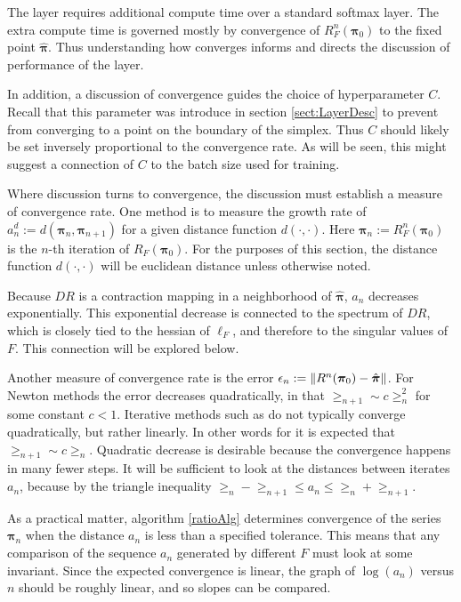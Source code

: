 \label{sect:expConvRate}
The \RS layer requires additional compute time over a standard softmax layer. The extra compute time is governed mostly by convergence of \( R_F^n(\bm\pi_0) \) to the fixed point \( \hat{\bm \pi} \). Thus understanding how \DR converges informs and directs the discussion of performance of the \RS layer.  

In addition, a discussion of convergence guides the choice of hyperparameter \( C \). Recall that this parameter was introduce in section \ref{sect:LayerDesc} to prevent \DR from converging to a point on the boundary of the simplex. Thus \( C \) should likely be set inversely proportional to the convergence rate. As will be seen, this might suggest a connection of \( C \) to the batch size used for training.

Where discussion turns to convergence, the discussion must establish a measure of convergence rate. One method is to measure the growth rate of \( a_{n}^d := d(\bm\pi_n, \bm\pi_{n+1}) \) for a given distance function \( d(\cdot,\cdot) \). Here \( \bm\pi_n :=R_F^{n}(\bm\pi_0) \) is the \( n \)-th iteration of \( R_F(\bm\pi_0) \). For the purposes of this section, the distance function \( d(\cdot,\cdot) \) will be euclidean distance unless otherwise noted.

Because \( DR \) is a contraction mapping in a neighborhood of \( \hat{\bm \pi} \), \( a_n \) decreases exponentially. This exponential decrease is connected to the spectrum of \( DR \), which is closely tied to the hessian of \( \ell_{F} \), and therefore to the singular values of \( F \).  This connection will be explored below.

Another measure of convergence rate is the error \( \epsilon_n\mathrel{\mathop{:}}=\norm{R^n(\bm\pi_0)-\hat{\bm \pi}} \). For Newton methods the error decreases quadratically, in that \( \ge_{n+1} \sim c\ge_n^2 \) for some constant \( c < 1\). Iterative methods such as \DR do not typically converge quadratically, but rather linearly. In other words for \DR it is expected that \( \ge_{n+1}\sim c\ge_n \).  Quadratic decrease is desirable because the convergence happens in many fewer steps. It will be sufficient to look at the distances between iterates \( a_n \), because by the triangle inequality \( \ge_n-\ge_{n+1}\leq a_n\leq \ge_n+\ge_{n+1} \).

As a practical matter, algorithm \ref{ratioAlg} determines convergence of the series \( \bm\pi_n \) when the distance \( a_n \) is less than a specified tolerance. This means that any comparison of the sequence \( a_n \) generated by different \( F \) must look at some invariant.  Since the expected convergence is linear, the graph of \( \log(a_n) \) versus \( n \) should be roughly linear, and so slopes can be compared.



